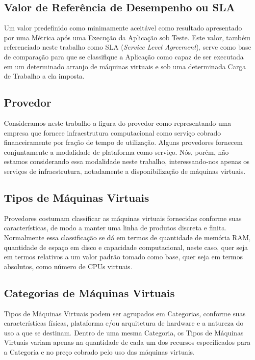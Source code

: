 \subsection{Valor de Referência de Desempenho ou SLA}
Um valor predefinido como minimamente aceitável como resultado apresentado por 
uma Métrica após uma Execução da Aplicação sob Teste. Este valor, também 
referenciado neste trabalho como SLA (\emph{Service Level Agreement}), serve como base 
de comparação para que se classifique a Aplicação como capaz de ser executada 
em um determinado arranjo de máquinas virtuais e sob uma determinada Carga de
Trabalho a ela imposta.

\subsection{Provedor}
Consideramos neste trabalho a figura do provedor como representando uma empresa 
que fornece infraestrutura computacional como serviço cobrado financeiramente 
por fração de tempo de utilização. Alguns provedores fornecem conjuntamente a 
modalidade de plataforma como serviço. Nós, porém, não estamos considerando essa 
modalidade neste trabalho, interessando-nos apenas os serviços de infraestrutura, 
notadamente a disponibilização de máquinas virtuais.

\subsection{Tipos de Máquinas Virtuais}
Provedores costumam classificar as máquinas virtuais fornecidas conforme suas 
características, de modo a manter uma linha de produtos discreta e finita. 
Normalmente essa classificação se dá em termos de quantidade de memória RAM, 
quantidade de espaço em disco e capacidade computacional, neste caso, quer seja 
em termos relativos a um valor padrão tomado como base, quer seja em termos 
absolutos, como número de CPUs virtuais.

\subsection{Categorias de Máquinas Virtuais}
\label{subsec:definicoes_categorias}
Tipos de Máquinas Virtuais podem ser agrupados em Categorias, conforme suas 
características físicas, plataforma e/ou arquitetura de hardware e a natureza do 
uso a que se destinam. Dentro de uma mesma Categoria, os Tipos de Máquinas 
Virtuais variam apenas na quantidade de cada um dos recursos especificados para 
a Categoria e no preço cobrado pelo uso das máquinas virtuais.

